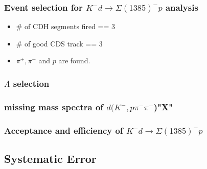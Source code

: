 \subsubsection{Event selection for $K^-d \rightarrow \Sigma(1385)^-p$ analysis}
\begin{itemize}
\item \# of CDH segments fired == 3
\item \# of good CDS track == 3
\item $\pi^+,\pi^-$ and $p$ are found.
\end{itemize}

\subsubsection{$\Lambda$ selection}

\subsubsection{missing mass spectra of $d(K^-,p\pi^-\pi^-$)"X"}

\subsubsection{Acceptance and efficiency of $K^-d \rightarrow \Sigma(1385)^-p$}


\subsection{Systematic Error}



